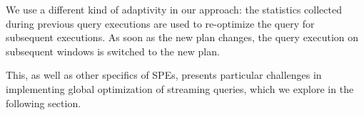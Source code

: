 We use a different kind of adaptivity in our approach: the statistics collected during previous query executions are used to re-optimize the query for subsequent executions. As soon as the new plan changes, the query execution on subsequent windows is switched to the new plan. 

This, as well as other specifics of SPEs, presents particular challenges in implementing global optimization of streaming queries, which we explore in the following section.

